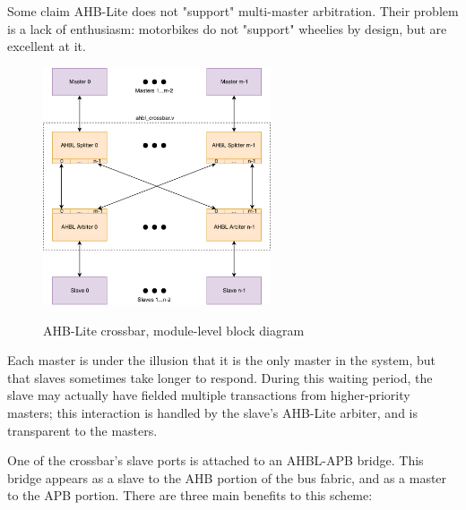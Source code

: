 \documentclass[notitlepage]{article}
\begin{document}
Some claim AHB-Lite does not "support" multi-master arbitration. Their problem is a lack of enthusiasm: motorbikes do not "support" wheelies by design, but are excellent at it.

\begin{figure}[!htb]
\centering
\caption{AHB-Lite crossbar, module-level block diagram} \includegraphics[width=0.6\textwidth]{diagrams/crossbar_structure.pdf}
\label{diagram:crossbar_structure}
\end{figure}

Each master is under the illusion that it is the only master in the system, but that slaves sometimes take longer to respond. During this waiting period, the slave may actually have fielded multiple transactions from higher-priority masters; this interaction is handled by the slave's AHB-Lite arbiter, and is transparent to the masters.

One of the crossbar's slave ports is attached to an AHBL-APB bridge. This bridge appears as a slave to the AHB portion of the bus fabric, and as a master to the APB portion. There are three main benefits to this scheme:
\end{document}
